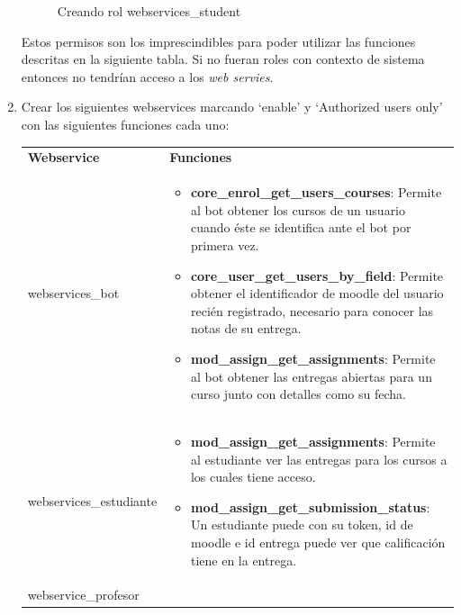 \begin{enumerate}
\begin{figure}[H]
\caption{Creando rol webservices\_student}\label{figura412}
\end{figure}

Estos permisos son los imprescindibles para poder utilizar las funciones descritas en la siguiente tabla. Si no fueran roles con contexto de sistema entonces no tendrían acceso a los \textit{web servies}.

\item Crear los siguientes webservices marcando \enquote*{enable} y \enquote*{Authorized users only}   con las siguientes funciones cada uno:

\begin{tabular}{|p{5cm}|p{8cm}|}
\hline
\textbf{Webservice}
\newline

 &
 
\textbf{Funciones}
  \\
webservices\_bot
\newline

 &
 
\begin{itemize}
\item \textbf{core\_enrol\_get\_users\_courses}: Permite al bot obtener los cursos de un usuario cuando éste se identifica ante el bot por primera vez.
\item \textbf{core\_user\_get\_users\_by\_field}: Permite obtener el identificador de moodle del usuario recién registrado, necesario para conocer las notas de su entrega.
\item \textbf{mod\_assign\_get\_assignments}: Permite al bot obtener las entregas abiertas para un curso junto con detalles como su fecha.
\end{itemize}
  \\
webservices\_estudiante
\newline

 &
 
\begin{itemize}
\item \textbf{mod\_assign\_get\_assignments}: Permite al estudiante ver las entregas para los cursos a los cuales tiene acceso.
\item \textbf{mod\_assign\_get\_submission\_status}: Un estudiante puede con su token, id de moodle e id entrega puede ver que calificación tiene en la entrega.
\end{itemize}
  \\
webservice\_profesor
\newline


\end{tabular}
\end{enumerate}
